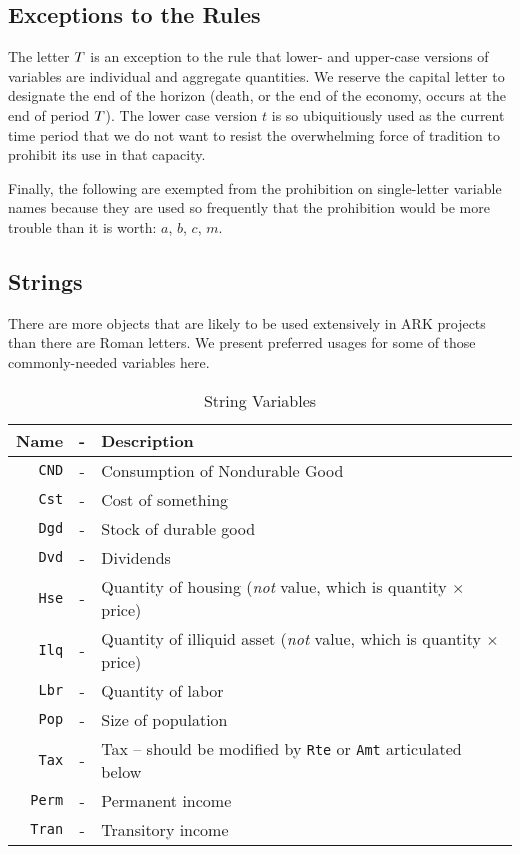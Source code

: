 \documentclass[12pt]{econtex}
\begin{document}
\subsection{Exceptions to the Rules}

The letter $T$ is an exception to the rule that lower- and upper-case versions of variables are individual and aggregate quantities.  We reserve the capital letter to designate the end of the horizon (death, or the end of the economy, occurs at the end of period $T$).  The lower case version $t$ is so ubiquitiously used as the current time period that we do not want to resist the overwhelming force of tradition to prohibit its use in that capacity.

Finally, the following are exempted from the prohibition on single-letter variable names because they are used so frequently that the prohibition would be more trouble than it is worth: $a$, $b$, $c$, $m$.  


\pagebreak

\subsection{Strings}

There are more objects that are likely to be used extensively in ARK projects than there are Roman letters.  We present preferred usages for some of those commonly-needed variables here.

\begin{table}[h]
\begin{center}
\begin{tabular}{|rcl|}
\hline
Name & - & Description 
 \\ \hline
     \texttt{CND}    & - & Consumption of Nondurable Good 
 \\  \texttt{Cst}    & - & Cost of something 
 \\  \texttt{Dgd}    & - & Stock of durable good
 \\  \texttt{Dvd}    & - & Dividends 
 \\  \texttt{Hse}    & - & Quantity of housing (\textit{not} value, which is quantity $\times$ price)
 \\  \texttt{Ilq}    & - & Quantity of illiquid asset (\textit{not} value, which is quantity $\times$ price)
 \\  \texttt{Lbr}    & - & Quantity of labor
 \\  \texttt{Pop}    & - & Size of population
 \\  \texttt{Tax} & - & Tax -- should be modified by \texttt{Rte} or \texttt{Amt} articulated below
 \\  \texttt{Perm}   & - & Permanent income
 \\  \texttt{Tran}   & - & Transitory income
\\ \hline
\end{tabular}
\caption{String Variables}
\label{table:Strings}
\end{center}
\end{table}
\end{document}
